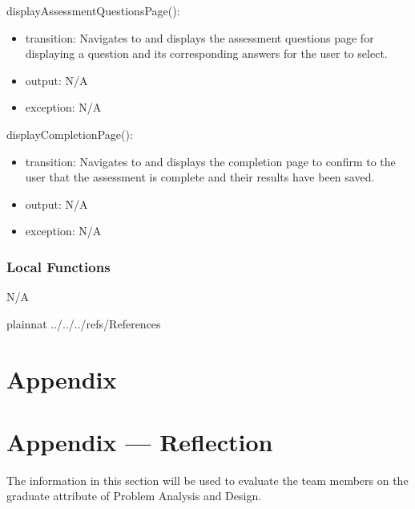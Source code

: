 \documentclass[12pt, titlepage]{article}
\begin{document}
\noindent displayAssessmentQuestionsPage():
\begin{itemize}
\item transition: Navigates to and displays the assessment questions page for displaying a question and its corresponding answers for the user to select.
\item output: N/A
\item exception: N/A
\end{itemize}

\noindent displayCompletionPage():
\begin{itemize}
\item transition: Navigates to and displays the completion page to confirm to the user that the assessment is complete and their results have been saved.
\item output: N/A
\item exception: N/A
\end{itemize}

\subsubsection{Local Functions}
N/A

\newpage

\newpage

 {plainnat}
 {../../../refs/References}

\newpage

\section{Appendix} \label{Appendix}


\newpage{}

\section*{Appendix --- Reflection}


The information in this section will be used to evaluate the team members on the
graduate attribute of Problem Analysis and Design.


\end{document}
